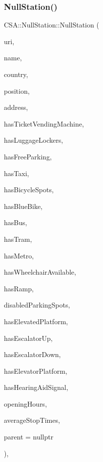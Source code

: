 \subsubsection{\texorpdfstring{Null\+Station()}{NullStation()}}
{\footnotesize\ttfamily C\+S\+A\+::\+Null\+Station\+::\+Null\+Station (\begin{DoxyParamCaption}\item[{const Q\+Url \&}]{uri,  }\item[{const Q\+Map$<$ Q\+Locale\+::\+Language, Q\+String $>$ \&}]{name,  }\item[{const Q\+Locale\+::\+Country \&}]{country,  }\item[{const Q\+Geo\+Coordinate \&}]{position,  }\item[{const Q\+Geo\+Address \&}]{address,  }\item[{const bool \&}]{has\+Ticket\+Vending\+Machine,  }\item[{const bool \&}]{has\+Luggage\+Lockers,  }\item[{const bool \&}]{has\+Free\+Parking,  }\item[{const bool \&}]{has\+Taxi,  }\item[{const bool \&}]{has\+Bicycle\+Spots,  }\item[{const bool \&}]{has\+Blue\+Bike,  }\item[{const bool \&}]{has\+Bus,  }\item[{const bool \&}]{has\+Tram,  }\item[{const bool \&}]{has\+Metro,  }\item[{const bool \&}]{has\+Wheelchair\+Available,  }\item[{const bool \&}]{has\+Ramp,  }\item[{const qint16 \&}]{disabled\+Parking\+Spots,  }\item[{const bool \&}]{has\+Elevated\+Platform,  }\item[{const bool \&}]{has\+Escalator\+Up,  }\item[{const bool \&}]{has\+Escalator\+Down,  }\item[{const bool \&}]{has\+Elevator\+Platform,  }\item[{const bool \&}]{has\+Hearing\+Aid\+Signal,  }\item[{const Q\+Map$<$ \mbox{\hyperlink{classCSA_1_1Station_aa160d0de40db0583099b5986dea1cd67}{C\+S\+A\+::\+Station\+::\+Day}}, Q\+Pair$<$ Q\+Time, Q\+Time $>$$>$ \&}]{opening\+Hours,  }\item[{const qreal \&}]{average\+Stop\+Times,  }\item[{Q\+Object $\ast$}]{parent = {\ttfamily nullptr} }\end{DoxyParamCaption})\hspace{0.3cm}{\ttfamily [explicit]}, {\ttfamily [private]}}



